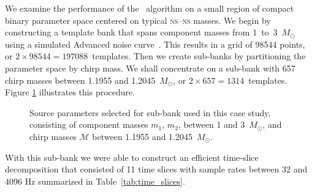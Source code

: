 We examine the performance of the \lloid\ algorithm on a small region of
compact binary parameter space centered on typical \textsc{ns}--\textsc{ns}
masses.  We begin by constructing a template bank that spans component masses
from 1~to~3~$M_\odot$ using a simulated Advanced \LIGO{} noise
curve~\citep{ALIGONoise}.  This results in a grid of 98544 points, or
$2 \times 98544 = 197088$~templates.  Then we create sub-banks by partitioning
the parameter space by chirp mass.  We shall concentrate on a sub-bank with 657
chirp masses between 1.1955 and 1.2045~$M_\odot$, or $2 \times 657 = 1314$~templates.
Figure \ref{fig:tmpltbank} illustrates this procedure.
\begin{figure}[h]
	\caption{\label{fig:tmpltbank}Source parameters selected for sub-bank used in this
case study, consisting of component masses $m_1$, $m_2$, between 1 and 3~$M_\odot$, and
chirp masses $\mathcal{M}$ between 1.1955 and 1.2045~$M_\odot$.}
\end{figure}
With this sub-bank we were able to construct an efficient time-slice decomposition
that consisted of 11 time slices with sample rates between 32 and 4096 Hz summarized
in Table~\ref{tab:time_slices}.

